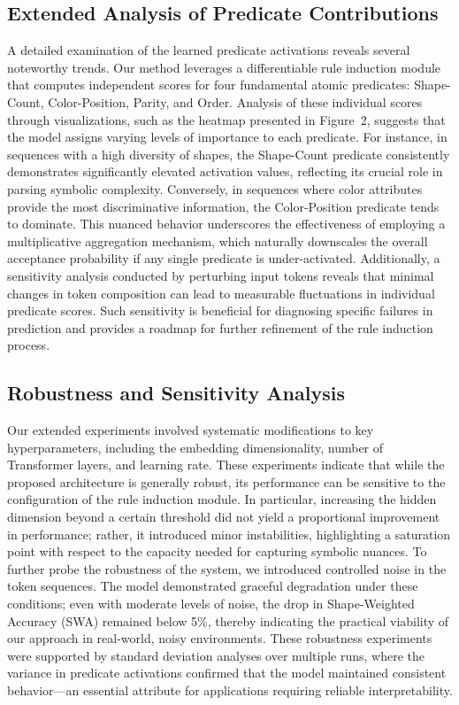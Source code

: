 \documentclass{article}
\begin{document}
\subsection*{Extended Analysis of Predicate Contributions}
A detailed examination of the learned predicate activations reveals several noteworthy trends. Our method leverages a differentiable rule induction module that computes independent scores for four fundamental atomic predicates: Shape-Count, Color-Position, Parity, and Order. Analysis of these individual scores through visualizations, such as the heatmap presented in Figure~2, suggests that the model assigns varying levels of importance to each predicate. For instance, in sequences with a high diversity of shapes, the Shape-Count predicate consistently demonstrates significantly elevated activation values, reflecting its crucial role in parsing symbolic complexity. Conversely, in sequences where color attributes provide the most discriminative information, the Color-Position predicate tends to dominate. This nuanced behavior underscores the effectiveness of employing a multiplicative aggregation mechanism, which naturally downscales the overall acceptance probability if any single predicate is under-activated. Additionally, a sensitivity analysis conducted by perturbing input tokens reveals that minimal changes in token composition can lead to measurable fluctuations in individual predicate scores. Such sensitivity is beneficial for diagnosing specific failures in prediction and provides a roadmap for further refinement of the rule induction process.

\subsection*{Robustness and Sensitivity Analysis}
Our extended experiments involved systematic modifications to key hyperparameters, including the embedding dimensionality, number of Transformer layers, and learning rate. These experiments indicate that while the proposed architecture is generally robust, its performance can be sensitive to the configuration of the rule induction module. In particular, increasing the hidden dimension beyond a certain threshold did not yield a proportional improvement in performance; rather, it introduced minor instabilities, highlighting a saturation point with respect to the capacity needed for capturing symbolic nuances. To further probe the robustness of the system, we introduced controlled noise in the token sequences. The model demonstrated graceful degradation under these conditions; even with moderate levels of noise, the drop in Shape-Weighted Accuracy (SWA) remained below 5\%, thereby indicating the practical viability of our approach in real-world, noisy environments. These robustness experiments were supported by standard deviation analyses over multiple runs, where the variance in predicate activations confirmed that the model maintained consistent behavior—an essential attribute for applications requiring reliable interpretability.
\end{document}
